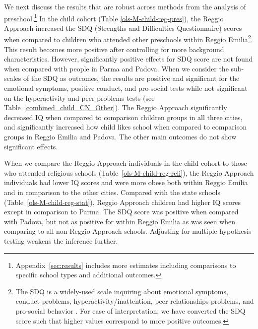 We next discuss the results that are robust across methods from the analysis of preschool.\footnote{Appendix~\ref{sec:results} includes more estimates including comparisons to specific school types and additional outcomes.} In the child cohort (Table \ref{ols-M-child-reg-pres}), the Reggio Approach increased the SDQ (Strengths and Difficulties Questionnaire) scores when compared to children who attended other preschools within Reggio Emilia\footnote{The SDQ is a widely-used scale inquiring about emotional symptoms, conduct problems, hyperactivity/inattention, peer relationships problems, and pro-social behavior \citep{Goodman_1997_JCPP}. For ease of interpretation, we have converted the SDQ score such that higher values correspond to more positive outcomes.}. This result becomes more positive after controlling for more background characteristics. However, significantly positive effects for SDQ score are not found when compared with people in Parma and Padova. When we consider the sub-scales of the SDQ as outcomes, the results are positive and significant for the emotional symptoms, positive conduct, and pro-social tests while not significant on the hyperactivity and peer problems tests (see Table~\ref{combined_child_CN_Other}). The Reggio Approach significantly decreased IQ when compared to comparison children groups in all three cities, and significantly increased how child likes school when compared to comparison groups in Reggio Emilia and Padova. The other main outcomes do not show significant effects.

When we compare the Reggio Approach individuals in the child cohort to those who attended religious schools (Table~\ref{ols-M-child-reg-reli}), the Reggio Approach individuals had lower IQ scores and were more obese both within Reggio Emilia and in comparison to the other cities. Compared with the state schools (Table~\ref{ols-M-child-reg-stat}), Reggio Approach children had higher IQ scores except in comparison to Parma. The SDQ score was positive when compared with Padova, but not as positive for within Reggio Emilia as was seen when comparing to all non-Reggio Approach schools. Adjusting for multiple hypothesis testing weakens the inference further.

